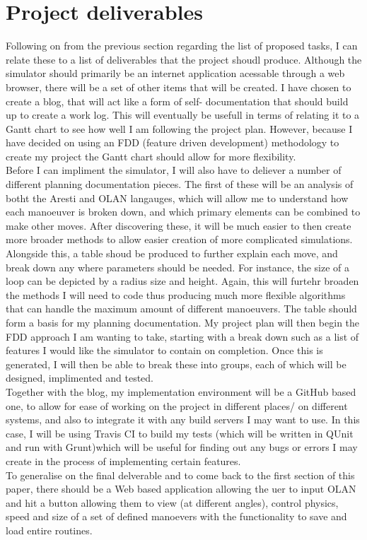 \documentclass[11pt,fleqn,twoside]{article}
\begin{document}
\section{Project deliverables}
Following on from the previous section regarding the list of proposed tasks, I can relate these to a list of deliverables that the project shoudl produce. Although the simulator should primarily be an internet application acessable through a web browser, there will be a set of other items that will be created. I have chosen to create a blog, that will act like a form of self- documentation that should build up to create a work log. This will eventually be usefull in terms of relating it to a Gantt chart to see how well I am following the project plan. However, because I have decided on using an FDD (feature driven development) methodology to create my project the Gantt chart should allow for more flexibility. \\
Before I can impliment the simulator, I will also have to deliever a number of different planning documentation pieces. The first of these will be an analysis of botht the Aresti and OLAN langauges, which will allow me to understand how each manoeuver is broken down, and which primary elements can be combined to make other moves. After discovering these, it will be much easier to then create more broader methods to allow easier creation of more complicated simulations. \\
Alongside this, a table shoud be produced to further explain each move, and break down any where parameters should be needed. For instance, the size of a loop can be depicted by a radius size and height. Again, this will furtehr broaden the methods I will need to code thus producing much more flexible algorithms that can handle the maximum amount of different manoeuvers. The table should form a basis for my planning documentation. My project plan will then begin the FDD approach I am wanting to take, starting with a break down such as a list of features I would like the simulator to contain on completion. Once this is generated, I will then be able to break these into groups, each of which will be designed, implimented and tested.\\
Together with the blog, my implementation environment will be a GitHub based one, to allow for ease of working on the project in different places/ on different systems, and also to integrate it with any build servers I may want to use. In this case, I will be using Travis CI\cite{Travis} to build my tests (which will be written in QUnit\cite{QUnit} and run with Grunt\cite{Grunt})which will be useful for finding out any bugs or errors I may create in the process of implementing certain features.\\
To generalise on the final delverable and to come back to the first section of this paper, there should be a Web based application allowing the uer to input OLAN and hit a button allowing them to view (at different angles), control physics, speed and size of a set of defined manoevers with the functionality to save and load entire routines.
\end{document}
